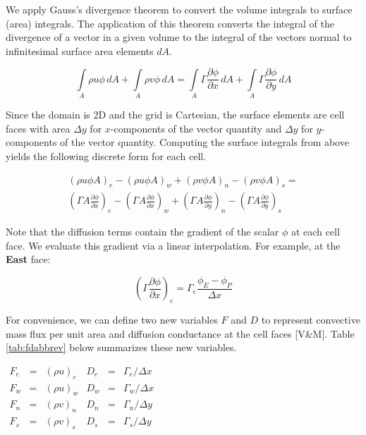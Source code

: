 \documentclass{article}
\newcommand{\dby}[2]{\frac{\partial #1}{\partial #2}}
\newcommand{\intb}[1]{\int\limits_{#1}}
\newcommand{\lp}{\left(}
\newcommand{\rp}{\right)}
\begin{document}
We apply Gauss's divergence theorem to convert the volume integrals to surface (area) integrals. The application of this theorem converts the integral of the divergence of a vector in a given volume to the integral of the vectors normal to infinitesimal surface area elements $dA$. 

\begin{equation}
    \intb{A} \rho u \phi\,dA + \intb{A} \rho v \phi\,dA = \intb{A} \Gamma \dby{\phi}{x}\,dA + \intb{A} \Gamma \dby{\phi}{y}\,dA
\end{equation}

Since the domain is 2D and the grid is Cartesian, the surface elements are cell faces with area $\Delta y$ for $x$-components of the vector quantity and $\Delta y$ for $y$-components of the vector quantity. Computing the surface integrals from above yields the following discrete form for each cell.

\begin{multline*}
   \lp \rho u \phi A \rp_e - \lp \rho u \phi A \rp_w +
   \lp \rho v \phi A \rp_n - \lp \rho v \phi A \rp_s = \\
   \lp \Gamma A \dby{\phi}{x} \rp_e - \lp \Gamma A \dby{\phi}{x} \rp_w + \lp \Gamma A \dby{\phi}{y} \rp_n - \lp \Gamma A \dby{\phi}{y} \rp_s
\end{multline*}

Note that the diffusion terms contain the gradient of the scalar $\phi$ at each cell face. We evaluate this gradient via a linear interpolation. For example, at the \textbf{East} face:

\begin{equation}
   \lp \Gamma \dby{\phi}{x} \rp_e = \Gamma_e \frac{\phi_E - \phi_P}{\Delta x}
\end{equation}

For convenience, we can define two new variables $F$ and $D$ to represent convective mass flux per unit area and diffusion conductance at the cell faces [V\&M]. Table \ref{tab:fdabbrev} below summarizes these new variables.

\begin{table}[!ht]
\centering
\label{tab:fdabbrev}
$\begin{array}{lcllcl}
     F_e &=& \lp \rho u \rp_e & D_e &=& \Gamma_e/\Delta x \\
     F_w &=& \lp \rho u \rp_w & D_w &=& \Gamma_w/\Delta x \\
     F_n &=& \lp \rho v \rp_n & D_n &=& \Gamma_n/\Delta y \\
     F_s &=& \lp \rho v \rp_s & D_s &=& \Gamma_s/\Delta y
\end{array}$
\end{table}
\end{document}
